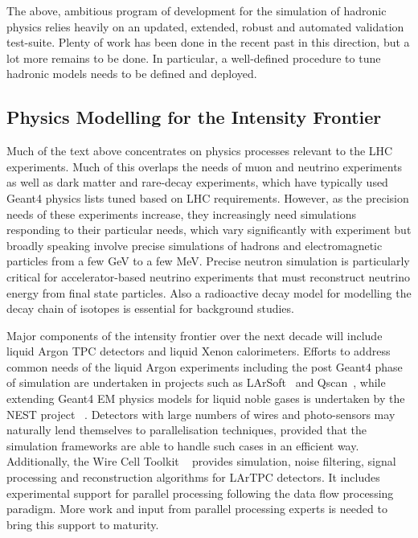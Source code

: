 \documentclass[12pt,a4paper]{article}
\begin{document}
{The above, ambitious program of development for the simulation of
hadronic physics relies heavily on an updated, extended, robust and
automated validation test-suite. Plenty of work has been done in the
recent past in this direction, but a lot more remains to be done. In
particular, a well-defined procedure to tune hadronic models needs to be
defined and deployed.


\hypertarget{physics-modelling-for-the-intensity-frontier}{%
\subsection{Physics Modelling for the Intensity
Frontier}\label{physics-modelling-for-the-intensity-frontier}}

Much of the text above concentrates on physics processes relevant to the
LHC experiments. Much of this overlaps the needs of muon and neutrino
experiments as well as dark matter and rare-decay experiments, which
have typically used Geant4 physics lists tuned based on LHC
requirements. However, as the precision needs of these experiments
increase, they increasingly need simulations responding to their
particular needs, which vary significantly with experiment but broadly
speaking involve precise simulations of hadrons and electromagnetic
particles from a few GeV to a few MeV. Precise neutron simulation is
particularly critical for accelerator-based neutrino experiments that
must reconstruct neutrino energy from final state particles. Also a
radioactive decay model for modelling the decay chain of isotopes is
essential for background studies.

Major components of the intensity frontier over the next decade will
include liquid Argon TPC detectors and liquid Xenon calorimeters.
Efforts to address common needs of the liquid Argon experiments
including the post Geant4 phase of simulation are undertaken in projects
such as LArSoft~\cite{LArSoft} and Qscan~\cite{LArLEM-TPC}, while extending Geant4 EM
physics models for liquid noble gases is undertaken by the NEST project
~\cite{Szydagis:2013sih}. Detectors with large numbers of wires and photo-sensors may
naturally lend themselves to parallelisation techniques, provided that
the simulation frameworks are able to handle such cases in an efficient
way. Additionally, the Wire Cell Toolkit ~\cite{Wire-Cell} provides simulation,
noise filtering, signal processing and reconstruction algorithms for
LArTPC detectors. It includes experimental support for parallel
processing following the data flow processing paradigm. More work and
input from parallel processing experts is needed to bring this support
to maturity.

}
\end{document}
